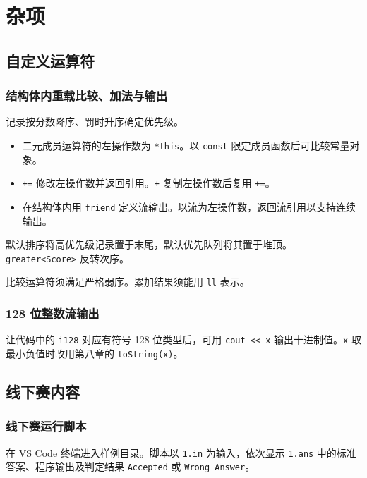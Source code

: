 \chapter{杂项}

\section{自定义运算符}

\subsection{结构体内重载比较、加法与输出}

记录按分数降序、罚时升序确定优先级。

\begin{itemize}
    \item 二元成员运算符的左操作数为 \texttt{*this}。以 \texttt{const} 限定成员函数后可比较常量对象。
    \item \texttt{+=} 修改左操作数并返回引用。\texttt{+} 复制左操作数后复用 \texttt{+=}。
    \item 在结构体内用 \texttt{friend} 定义流输出。以流为左操作数，返回流引用以支持连续输出。
\end{itemize}


默认排序将高优先级记录置于末尾，默认优先队列将其置于堆顶。\texttt{greater<Score>} 反转次序。

比较运算符须满足严格弱序。累加结果须能用 \texttt{ll} 表示。

\subsection{128 位整数流输出}

让代码中的 \texttt{i128} 对应有符号 128 位类型后，可用 \texttt{cout << x} 输出十进制值。\texttt{x} 取最小负值时改用第八章的 \texttt{toString(x)}。


\section{线下赛内容}

\subsection{线下赛运行脚本}

在 VS Code 终端进入样例目录。脚本以 \texttt{1.in} 为输入，依次显示 \texttt{1.ans} 中的标准答案、程序输出及判定结果 \texttt{Accepted} 或 \texttt{Wrong Answer}。

